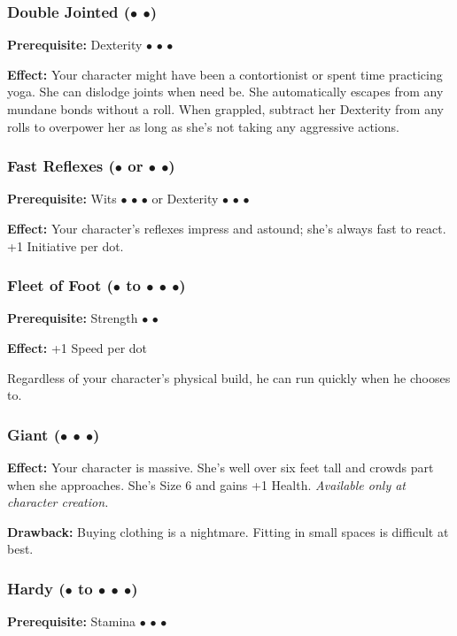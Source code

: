 \documentclass["../Misguided by Starlight.tex"]{subfiles}
\begin{document}
	\subsubsection{Double Jointed ($\bullet$ $\bullet$)} %
		\textbf{Prerequisite:} Dexterity $\bullet$ $\bullet$ $\bullet$
		
		\textbf{Effect:} Your character might have been a contortionist or spent time practicing yoga. She can dislodge joints when need be. She automatically escapes from any mundane bonds without a roll. When grappled, subtract her Dexterity from any rolls to overpower her as long as she’s not taking any aggressive actions.
	
	\subsubsection{Fast Reflexes ($\bullet$ or $\bullet$ $\bullet$)} %
		\textbf{Prerequisite:} Wits $\bullet$ $\bullet$ $\bullet$ or Dexterity $\bullet$ $\bullet$ $\bullet$
		
		\textbf{Effect:} Your character’s reflexes impress and astound; she’s always fast to react. +1 Initiative per dot.
	
	\subsubsection{Fleet of Foot ($\bullet$ to $\bullet$ $\bullet$ $\bullet$)} %
		 \textbf{Prerequisite:} Strength $\bullet$ $\bullet$
		 
		 \textbf{Effect:}  +1 Speed per dot 
		 	
		Regardless of your character’s physical build, he can run quickly when he chooses to.
	
	\subsubsection{Giant ($\bullet$ $\bullet$ $\bullet$)} %
		\textbf{Effect:} Your character is massive. She’s well over six feet tall and crowds part when she approaches. She’s Size 6 and gains +1 Health. \emph{Available only at character creation.}
		
		\textbf{Drawback:} Buying clothing is a nightmare. Fitting in small spaces is difficult at best.
	
	\subsubsection{Hardy ($\bullet$ to $\bullet$ $\bullet$ $\bullet$)} %
		\textbf{Prerequisite:}  Stamina $\bullet$ $\bullet$ $\bullet$
		
\end{document}
